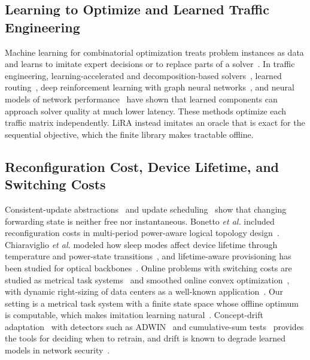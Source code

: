 \documentclass[journal]{IEEEtran}
\begin{document}
\subsection{Learning to Optimize and Learned Traffic Engineering}

Machine learning for combinatorial optimization treats problem instances as data and learns to imitate expert decisions or to replace parts of a solver~\cite{bengio2021mlco}. In traffic engineering, learning-accelerated and decomposition-based solvers~\cite{xu2023teal,perry2023dote,abuzaid2021ncflow,narayanan2021pop}, learned routing~\cite{valadarsky2017learning}, deep reinforcement learning with graph neural networks~\cite{almasan2022enero,bernardez2023magnneto}, and neural models of network performance~\cite{rusek2020routenet} have shown that learned components can approach solver quality at much lower latency. These methods optimize each traffic matrix independently. LiRA instead imitates an oracle that is exact for the sequential objective, which the finite library makes tractable offline.

\subsection{Reconfiguration Cost, Device Lifetime, and Switching Costs}

Consistent-update abstractions~\cite{reitblatt2012abstractions} and update scheduling~\cite{jin2014dionysus} show that changing forwarding state is neither free nor instantaneous. Bonetto \emph{et al.} included reconfiguration costs in multi-period power-aware logical topology design~\cite{bonetto2013multiperiod}. Chiaraviglio \emph{et al.} modeled how sleep modes affect device lifetime through temperature and power-state transitions~\cite{chiaraviglio2015lifetime,chiaraviglio2014impact}, and lifetime-aware provisioning has been studied for optical backbones~\cite{wiatr2016lifetime}. Online problems with switching costs are studied as metrical task systems~\cite{borodin1992mts} and smoothed online convex optimization~\cite{chen2018obd}, with dynamic right-sizing of data centers as a well-known application~\cite{lin2013rightsizing}. Our setting is a metrical task system with a finite state space whose offline optimum is computable, which makes imitation learning natural~\cite{ross2011dagger}. Concept-drift adaptation~\cite{gama2014drift,lu2019drift} with detectors such as ADWIN~\cite{bifet2007adwin} and cumulative-sum tests~\cite{page1954cusum} provides the tools for deciding when to retrain, and drift is known to degrade learned models in network security~\cite{andresini2021insomnia}.
\end{document}
